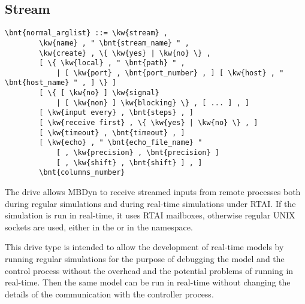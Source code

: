 \subsection{Stream}\label{sec:Stream}
\begin{Verbatim}[commandchars=\\\{\}]
    \bnt{normal_arglist} ::= \kw{stream} ,
        \kw{name} , " \bnt{stream_name} " ,
        \kw{create} , \{ \kw{yes} | \kw{no} \} ,
        [ \{ \kw{local} , " \bnt{path} " ,
            | [ \kw{port} , \bnt{port_number} , ] [ \kw{host} , " \bnt{host_name} " , ] \} ]
        [ \{ [ \kw{no} ] \kw{signal}
            | [ \kw{non} ] \kw{blocking} \} , [ ... ] , ]
        [ \kw{input every} , \bnt{steps} , ]
        [ \kw{receive first} , \{ \kw{yes} | \kw{no} \} , ]
        [ \kw{timeout} , \bnt{timeout} , ]
        [ \kw{echo} , " \bnt{echo_file_name} "
            [ , \kw{precision} , \bnt{precision} ]
            [ , \kw{shift} , \bnt{shift} ] , ]
        \bnt{columns_number}
\end{Verbatim}
The  drive allows MBDyn to receive streamed inputs 
from remote processes both during regular simulations and during 
real-time simulations under RTAI.
If the simulation is run in real-time, it uses RTAI mailboxes, 
otherwise regular UNIX sockets are used, either in the  or 
in the  namespace.

This drive type is intended to allow the development of real-time models
by running regular simulations for the purpose of debugging the model
and the control process without the overhead and the potential problems
of running in real-time.
Then the same model can be run in real-time without changing the details
of the communication with the controller process.

